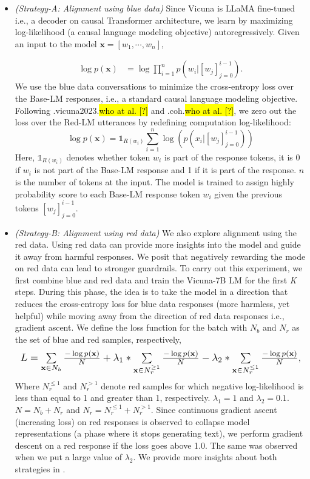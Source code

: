 \documentclass{article}
\let\realcitet\citet
\renewcommand{\citet}[1]{\ifx.#1.\hl{who at al. [?]}\else\realcitet{#1}\fi}
\begin{document}
{\begin{itemize}
    \item \textit{(Strategy-A: Alignment using blue data)} Since Vicuna is LLaMA fine-tuned i.e., a decoder on causal Transformer architecture, we learn by maximizing log-likelihood (a causal language modeling objective) autoregressively. Given an input to the model $\mathbf{x}=[w_1,\cdots,w_n]$, 
    
\begin{align}
    \log p(\mathbf{x}) & = \log \prod\limits_{i=1}^{n} p(w_i \vert [w_j]_{j=0}^{i-1} ).
\end{align}
We use the blue data conversations to minimize the cross-entropy loss over the Base-LM responses, i.e., a standard causal language modeling objective. Following \citet{vicuna2023} and \citet{coh}, we zero out the loss over the Red-LM utterances by redefining computation log-likelihood:
\begin{equation}
    \log p(\mathbf{x})  = \mathds{1}_{R(w_i)}  \sum \limits_{i=1}^{n} \log ( p(x_i | [w_j]_{j=0}^{i-1}))
\end{equation}
Here, $\mathds{1}_{R(w_i)}$ denotes whether token $w_i$ is part of the response tokens, it is 0 if $w_i$ is not part of the Base-LM response and 1 if it is part of the response. $n$ is the number of tokens at the input. The model is trained to assign highly probability score to each Base-LM response token $w_i$ given the previous tokens $[w_j]_{j=0}^{i-1}$.

\item \textit{(Strategy-B: Alignment using red data)} We also explore alignment using the red data. Using red data can provide more insights into the model and guide it away from harmful responses. We posit that negatively rewarding the mode on red data can lead to stronger guardrails. To carry out this experiment, we first combine blue and red data and train the Vicuna-7B LM for the first \textit{K} steps. During this phase, the idea is to take the model in a direction that reduces the cross-entropy loss for blue data responses (more harmless, yet helpful) while moving away from the direction of red data responses i.e., gradient ascent. We define the loss function for the batch with $N_b$ and $N_r$ as the set of blue and red samples, respectively,
\begin{equation}
    \resizebox{0.95\linewidth}{!}{$L = \sum \limits_{\mathbf{x} \in N_b}  \frac{-\log p(\mathbf{x})}{N} + \lambda_1*\sum \limits_{\mathbf{x} \in N_r^{\geq1}} \frac{-\log p(\mathbf{x})}{N} - \lambda_2*\sum \limits_{\mathbf{x} \in N_r^{\leq1}}  \frac{-\log p(\mathbf{x})}{N}$},
\end{equation}
Where $N_r^{\leq1}$ and $N_r^{>1}$ denote red samples for which negative log-likelihood is less than equal to 1 and greater than 1, respectively. $\lambda_1=1$ and $\lambda_2=0.1$. $N=N_b+N_r$ and $N_r= N_r^{\leq1} + N_r^{>1}$. Since continuous gradient ascent (increasing loss) on red responses is observed to collapse model representations (a phase where it stops generating text), we perform gradient descent on a red response if the loss goes above 1.0. The same was observed when we put a large value of $\lambda_2$. We provide more insights about both strategies in .


\end{itemize}}
\end{document}
